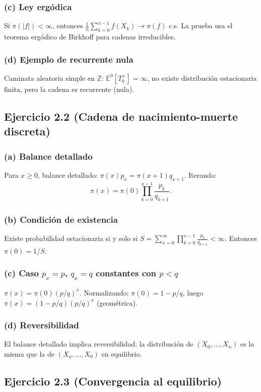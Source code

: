 \documentclass[12pt]{article}
\newcommand{\E}{\mathbb{E}}
\newcommand{\Z}{\mathbb{Z}}
\newcommand{\1}{\mathbf{1}}
\begin{document}
\subsubsection*{(c) Ley erg\'odica}
Si $\pi(|f|)<\infty$, entonces $\frac1n\sum_{k=0}^{n-1}f(X_k)\to\pi(f)$ c.s. La prueba usa el teorema erg\'odico de Birkhoff para cadenas irreducibles.

\subsubsection*{(d) Ejemplo de recurrente nula}
Caminata aleatoria simple en $\Z$: $\E^0[T_0^+]=\infty$, no existe distribuci\'on estacionaria finita, pero la cadena es recurrente (nula).

\subsection{Ejercicio 2.2 (Cadena de nacimiento-muerte discreta)}

\subsubsection*{(a) Balance detallado}
Para $x\ge0$, balance detallado: $\pi(x)p_x=\pi(x+1)q_{x+1}$. Iterando:
\[
\pi(x)=\pi(0)\prod_{k=0}^{x-1}\frac{p_k}{q_{k+1}}.
\]

\subsubsection*{(b) Condici\'on de existencia}
Existe probabilidad estacionaria si y solo si $S=\sum_{x=0}^\infty\prod_{k=0}^{x-1}\frac{p_k}{q_{k+1}}<\infty$. Entonces $\pi(0)=1/S$.

\subsubsection*{(c) Caso $p_x=p$, $q_x=q$ constantes con $p<q$}
$\pi(x)=\pi(0)(p/q)^x$. Normalizando: $\pi(0)=1-p/q$, luego $\pi(x)=(1-p/q)(p/q)^x$ (geométrica).

\subsubsection*{(d) Reversibilidad}
El balance detallado implica reversibilidad: la distribuci\'on de $(X_0,\dots,X_n)$ es la misma que la de $(X_n,\dots,X_0)$ en equilibrio.

\subsection{Ejercicio 2.3 (Convergencia al equilibrio)}
\end{document}

